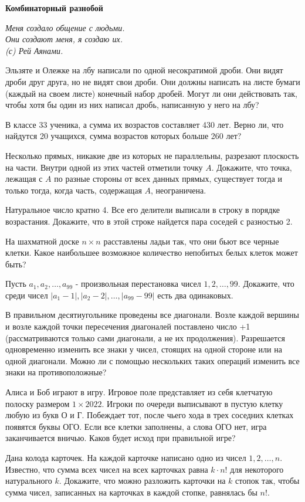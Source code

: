 \centerline{\bf \Huge Комбинаторный разнобой}

\begin{flushright}
        \scriptsize{\it Меня создало общение с людьми.\\
                        Они создают меня, я создаю их.\\
                        (с) Рей Аянами.}
\end{flushright}

Эльзяте и Олежке на лбу написали по одной несократимой дроби. Они видят дроби друг друга, но не видят свои дроби. Они должны написать на листе бумаги (каждый на своем листе) конечный набор дробей. Могут ли они действовать так, чтобы хотя бы один из них написал дробь, написанную у него на лбу?

В классе 33 ученика, а сумма их возрастов составляет 430 лет. Верно ли, что найдутся 20 учащихся, сумма возрастов которых больше 260 лет?

Несколько прямых, никакие две из которых не параллельны, разрезают плоскость на части. Внутри одной из этих частей отметили точку $A$. Докажите, что точка, лежащая с $A$ по разные стороны от всех данных прямых, существует тогда и только тогда, когда часть, содержащая $A$, неограничена.

Натуральное число кратно 4. Все его делители выписали в строку в порядке возрастания. Докажите, что в этой строке найдется пара соседей с разностью 2.

На шахматной доске $n \times n$ расставлены ладьи так, что они бьют все черные клетки. Какое наибольшее возможное количество непобитых белых клеток может быть?

Пусть $a_1, a_2, \ldots, a_{99}$ - произвольная перестановка чисел $1,2, \ldots, 99$. Докажите, что среди чисел $\left|a_1-1\right|,\left|a_2-2\right|, \ldots,\left|a_{99}-99\right|$ есть два одинаковых.

В правильном десятиугольнике проведены все диагонали. Возле каждой вершины и возле каждой точки пересечения диагоналей поставлено число +1 (рассматриваются только сами диагонали, а не их продолжения). Разрешается одновременно изменить все знаки у чисел, стоящих на одной стороне или на одной диагонали. Можно ли с помощью нескольких таких операций изменить все знаки на противоположные?

Алиса и Боб играют в игру. Игровое поле представляет из себя клетчатую полоску размером $1 \times 2022$. Игроки по очереди выписывают в пустую клетку любую из букв О и Г. Побеждает тот, после чьего хода в трех соседних клетках появятся буквы ОГО. Если все клетки заполнены, а слова ОГО нет, игра заканчивается вничью. Каков будет исход при правильной игре?

Дана колода карточек. На каждой карточке написано одно из чисел $1,2, \ldots, n$. Известно, что сумма всех чисел на всех карточках равна $k \cdot n!$ для некоторого натурального $k$. Докажите, что можно разложить карточки на $k$ стопок так, чтобы сумма чисел, записанных на карточках в каждой стопке, равнялась бы $n!$.